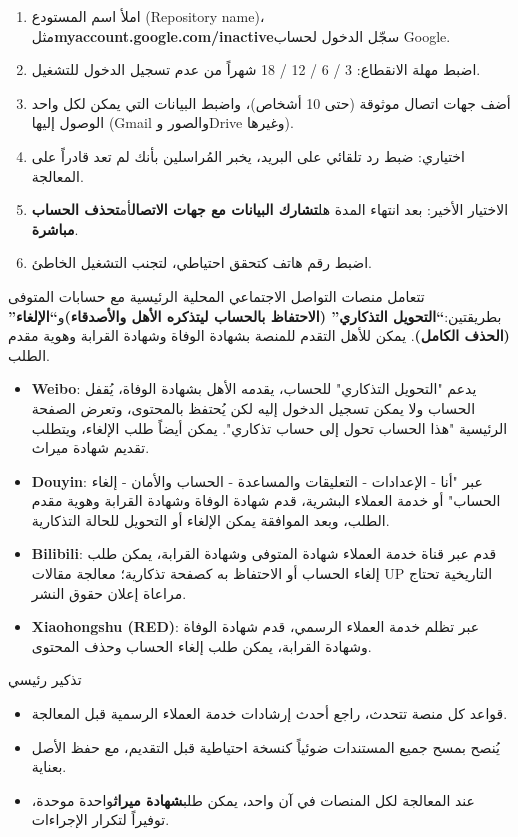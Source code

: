 \begin{enumerate}
  \item املأ اسم المستودع (Repository name)، مثل\textbf{myaccount.google.com/inactive}سجّل الدخول لحساب Google.
  \item اضبط مهلة الانقطاع: 3 / 6 / 12 / 18 شهراً من عدم تسجيل الدخول للتشغيل.
  \item أضف جهات اتصال موثوقة (حتى 10 أشخاص)، واضبط البيانات التي يمكن لكل واحد الوصول إليها (Gmail والصور وDrive وغيرها).
  \item اختياري: ضبط رد تلقائي على البريد، يخبر المُراسلين بأنك لم تعد قادراً على المعالجة.
  \item الاختيار الأخير: بعد انتهاء المدة هل\textbf{تشارك البيانات مع جهات الاتصال}أم\textbf{تحذف الحساب مباشرة}.
  \item اضبط رقم هاتف كتحقق احتياطي، لتجنب التشغيل الخاطئ.
\end{enumerate}


تتعامل منصات التواصل الاجتماعي المحلية الرئيسية مع حسابات المتوفى بطريقتين:\textbf{“التحويل التذكاري” (الاحتفاظ بالحساب ليتذكره الأهل والأصدقاء)}و\textbf{“الإلغاء” (الحذف الكامل)}. يمكن للأهل التقدم للمنصة بشهادة الوفاة وشهادة القرابة وهوية مقدم الطلب.

\begin{itemize}
  \item \textbf{Weibo}: يدعم "التحويل التذكاري" للحساب، يقدمه الأهل بشهادة الوفاة، يُقفل الحساب ولا يمكن تسجيل الدخول إليه لكن يُحتفظ بالمحتوى، وتعرض الصفحة الرئيسية "هذا الحساب تحول إلى حساب تذكاري". يمكن أيضاً طلب الإلغاء، ويتطلب تقديم شهادة ميراث.
  \item \textbf{Douyin}: عبر "أنا - الإعدادات - التعليقات والمساعدة - الحساب والأمان - إلغاء الحساب" أو خدمة العملاء البشرية، قدم شهادة الوفاة وشهادة القرابة وهوية مقدم الطلب، وبعد الموافقة يمكن الإلغاء أو التحويل للحالة التذكارية.
  \item \textbf{Bilibili}: قدم عبر قناة خدمة العملاء شهادة المتوفى وشهادة القرابة، يمكن طلب إلغاء الحساب أو الاحتفاظ به كصفحة تذكارية؛ معالجة مقالات UP التاريخية تحتاج مراعاة إعلان حقوق النشر.
  \item \textbf{Xiaohongshu (RED)}: عبر تظلم خدمة العملاء الرسمي، قدم شهادة الوفاة وشهادة القرابة، يمكن طلب إلغاء الحساب وحذف المحتوى.
\end{itemize}

\begin{tcbinfo}{تذكير رئيسي}
\begin{itemize}
  \item قواعد كل منصة تتحدث، راجع أحدث إرشادات خدمة العملاء الرسمية قبل المعالجة.
  \item يُنصح بمسح جميع المستندات ضوئياً كنسخة احتياطية قبل التقديم، مع حفظ الأصل بعناية.
  \item عند المعالجة لكل المنصات في آن واحد، يمكن طلب\textbf{شهادة ميراث}واحدة موحدة، توفيراً لتكرار الإجراءات.
\end{itemize}

\end{tcbinfo}

